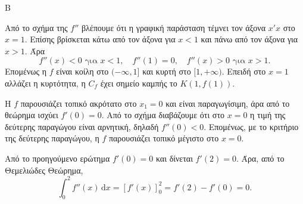 
\begin{thema}{Β}
\begin{erwthma}
\item Από το σχήμα της $f''$ βλέπουμε ότι η γραφική παράσταση τέμνει τον άξονα $x'x$ στο $x=1$. Επίσης βρίσκεται κάτω από τον άξονα για $x<1$ και πάνω από τον άξονα για $x>1$. Άρα
\[
f''(x)<0 \text{ για } x<1,\quad f''(1)=0,\quad f''(x)>0 \text{ για } x>1.
\]
Επομένως η $f$ είναι κοίλη στο $(-\infty,1]$ και κυρτή στο $[1,+\infty)$. Επειδή στο $x=1$ αλλάζει η κυρτότητα, η $C_f$ έχει σημείο καμπής το $K(1,f(1))$.

\item Η $f$ παρουσιάζει τοπικό ακρότατο στο $x_1=0$ και είναι παραγωγίσιμη, άρα από το θεώρημα  ισχύει $f'(0)=0$. Από το σχήμα διαβάζουμε ότι στο $x=0$ η τιμή της δεύτερης παραγώγου είναι αρνητική, δηλαδή $f''(0)<0$. Επομένως, με το κριτήριο της δεύτερης παραγώγου, η $f$ παρουσιάζει τοπικό μέγιστο στο $x=0$.

\item Από το προηγούμενο ερώτημα $f'(0)=0$ και δίνεται $f'(2)=0$. Άρα, από το Θεμελιώδες Θεώρημα,
\[
\int_0^2 f''(x)\,\mathrm{d}x=\left[f'(x)\right]_0^2=f'(2)-f'(0)=0.
\]
\end{erwthma}
\end{thema}


